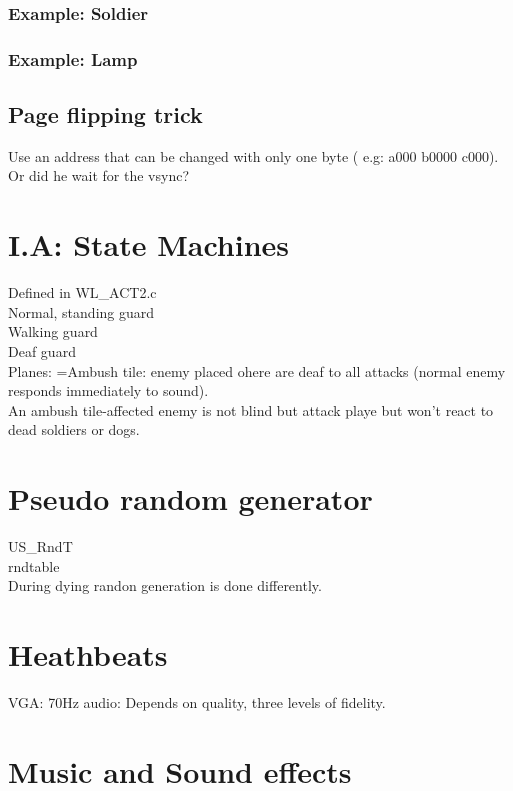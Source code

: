  \subsubsection{Example: Soldier} 
 \subsubsection{Example: Lamp}  
 
 
 
 
 
 
 
 
 
 
 
 
 
 
 
 
 \subsection{Page flipping trick}
 Use an address that can be changed with only one byte ( e.g: a000 b0000 c000).
 Or did he wait for the vsync?
\section{I.A: State Machines} 

Defined in WL\_ACT2.c\\
Normal, standing guard\\
Walking guard\\
Deaf guard\\

Planes:
=Ambush tile: enemy placed ohere are deaf to all attacks (normal enemy responds immediately to sound).\\
An ambush tile-affected enemy is not blind but attack playe but won't react to dead soldiers or dogs.\\


\section{Pseudo random generator}
US\_RndT\\
rndtable\\
During dying randon generation is done differently.

\section{Heathbeats}
VGA: 70Hz
audio: Depends on quality, three levels of fidelity.

\section{Music and Sound effects} 

